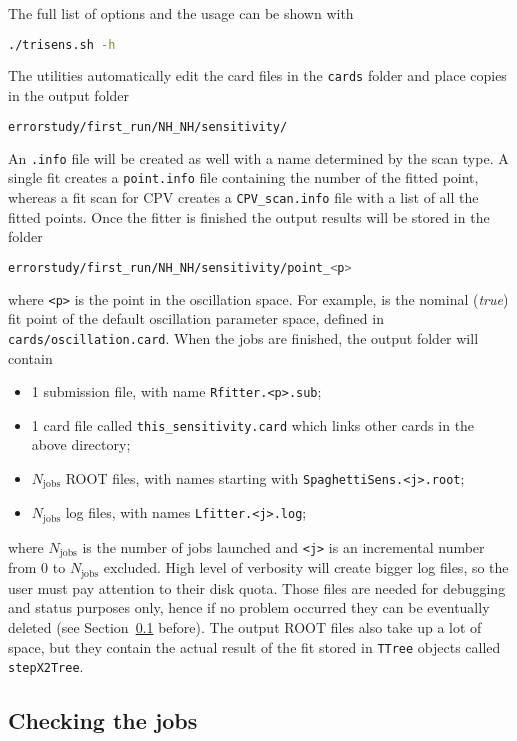 \documentclass[a4paper, 11pt]{article}
\newcommand{\refsec}[1]{Section~\ref{#1}}
\begin{document}
The full list of options and the usage can be shown with
\begin{lstlisting}[language=bash]
	./trisens.sh -h
\end{lstlisting}
The utilities automatically edit the card files in the \texttt{cards} folder and place copies %
in the output folder
\begin{lstlisting}[language=bash]
	errorstudy/first_run/NH_NH/sensitivity/
\end{lstlisting}
An \texttt{.info} file will be created as well with a name determined by the scan type.
A single fit creates a \texttt{point.info} file containing the number of the fitted point, %
whereas a fit scan for CPV creates a \texttt{CPV\_scan.info} file with a list of all the %
fitted points.
Once the fitter is finished the output results will be stored in the folder %
\begin{lstlisting}[language=bash]
	errorstudy/first_run/NH_NH/sensitivity/point_<p>
\end{lstlisting}
where \texttt{<p>} is the point in the oscillation space.
For example,  is the nominal (\emph{true}) fit point of the default oscillation parameter space, %
defined in \texttt{cards/oscillation.card}.
When the jobs are finished, the output folder will contain
\begin{itemize}
		\small
	\item 1 submission file, with name \texttt{Rfitter.<p>.sub};
	\item 1 card file called \texttt{this\_sensitivity.card} which links other cards in the above directory;
	\item $N_\text{jobs}$ ROOT files, with names starting with \texttt{SpaghettiSens.<j>.root};
	\item $N_\text{jobs}$ log files, with names \texttt{Lfitter.<j>.log};
\end{itemize}
where $N_\text{jobs}$ is the number of jobs launched and \texttt{<j>} is an incremental number %
from 0 to $N_\text{jobs}$ excluded.
High level of verbosity will create bigger log files, so the user must pay attention to their disk quota.
Those files are needed for debugging and status purposes only, %
hence if no problem occurred they can be eventually deleted (see \refsec{sec:complete} before).
The output ROOT files also take up a lot of space, but they contain the actual result of the fit %
stored in \texttt{TTree} objects called \texttt{stepX2Tree}.

\subsection{Checking the jobs}
\label{sec:complete}
\end{document}
